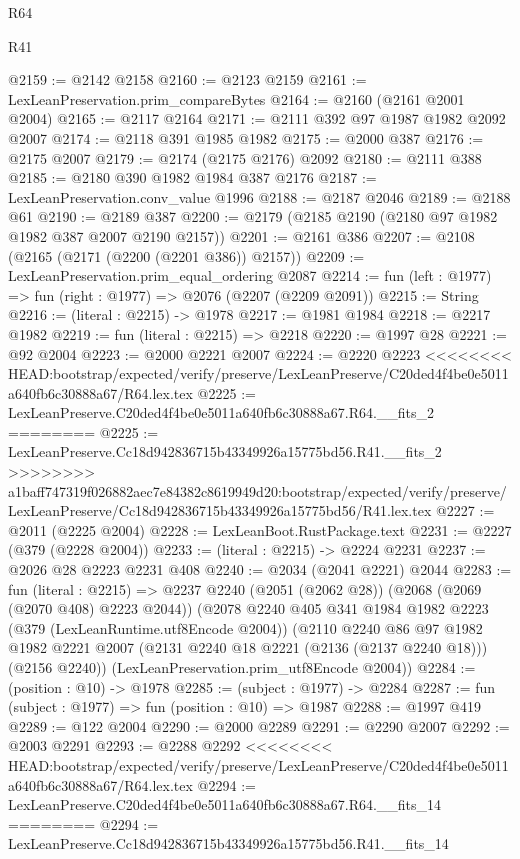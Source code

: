 \begin{lexlean}{R64}
\begin{lexlean}{R41}
\begin{coremodule}
{{{{{{{{{{{{{{{{{{{{{{{{{{{{{{{{{{{{{{{{{{{{{{{{{{{{{{{{{{{{{{{{{{{{{{{{{{{{{{{{{{{{{{{{{@2159 := @2142 @2158
@2160 := @2123 @2159
@2161 := LexLeanPreservation.prim_compareBytes
@2164 := @2160 (@2161 @2001 @2004)
@2165 := @2117 @2164
@2171 := @2111 @392 @97 @1987 @1982 @2092 @2007
@2174 := @2118 @391 @1985 @1982
@2175 := @2000 @387
@2176 := @2175 @2007
@2179 := @2174 (@2175 @2176) @2092
@2180 := @2111 @388
@2185 := @2180 @390 @1982 @1984 @387 @2176
@2187 := LexLeanPreservation.conv_value @1996
@2188 := @2187 @2046
@2189 := @2188 @61
@2190 := @2189 @387
@2200 := @2179 (@2185 @2190 (@2180 @97 @1982 @1982 @387 @2007 @2190 @2157))
@2201 := @2161 @386
@2207 := @2108 (@2165 (@2171 (@2200 (@2201 @386)) @2157))
@2209 := LexLeanPreservation.prim_equal_ordering @2087
@2214 := fun (left : @1977) => fun (right : @1977) => @2076 (@2207 (@2209 @2091))
@2215 := String
@2216 := (literal : @2215) -> @1978
@2217 := @1981 @1984
@2218 := @2217 @1982
@2219 := fun (literal : @2215) => @2218
@2220 := @1997 @28
@2221 := @92 @2004
@2223 := @2000 @2221 @2007
@2224 := @2220 @2223
<<<<<<<< HEAD:bootstrap/expected/verify/preserve/LexLeanPreserve/C20ded4f4be0e5011a640fb6c30888a67/R64.lex.tex
@2225 := LexLeanPreserve.C20ded4f4be0e5011a640fb6c30888a67.R64.__fits_2
========
@2225 := LexLeanPreserve.Cc18d942836715b43349926a15775bd56.R41.__fits_2
>>>>>>>> a1baff747319f026882aec7e84382c8619949d20:bootstrap/expected/verify/preserve/LexLeanPreserve/Cc18d942836715b43349926a15775bd56/R41.lex.tex
@2227 := @2011 (@2225 @2004)
@2228 := LexLeanBoot.RustPackage.text
@2231 := @2227 (@379 (@2228 @2004))
@2233 := (literal : @2215) -> @2224 @2231
@2237 := @2026 @28 @2223 @2231 @408
@2240 := @2034 (@2041 @2221) @2044
@2283 := fun (literal : @2215) =>
  @2237
    @2240
    (@2051 (@2062 @28))
    (@2068 (@2069 (@2070 @408) @2223 @2044))
    (@2078
      @2240
      @405
      @341
      @1984
      @1982
      @2223
      (@379 (LexLeanRuntime.utf8Encode @2004))
      (@2110
        @2240
        @86
        @97
        @1982
        @1982
        @2221
        @2007
        (@2131 @2240 @18 @2221 (@2136 (@2137 @2240 @18)))
        (@2156 @2240))
      (LexLeanPreservation.prim_utf8Encode @2004))
@2284 := (position : @10) -> @1978
@2285 := (subject : @1977) -> @2284
@2287 := fun (subject : @1977) => fun (position : @10) => @1987
@2288 := @1997 @419
@2289 := @122 @2004
@2290 := @2000 @2289
@2291 := @2290 @2007
@2292 := @2003 @2291
@2293 := @2288 @2292
<<<<<<<< HEAD:bootstrap/expected/verify/preserve/LexLeanPreserve/C20ded4f4be0e5011a640fb6c30888a67/R64.lex.tex
@2294 := LexLeanPreserve.C20ded4f4be0e5011a640fb6c30888a67.R64.__fits_14
========
@2294 := LexLeanPreserve.Cc18d942836715b43349926a15775bd56.R41.__fits_14
}}}}}}}}}}}}}}}}}}}}}}}}}}}}}}}}}}}}}}}}}}}}}}}}}}}}}}}}}}}}}}}}}}}}}}}}}}}}}}}}}}}}}}}}}
\end{coremodule}
\end{lexlean}
\end{lexlean}
